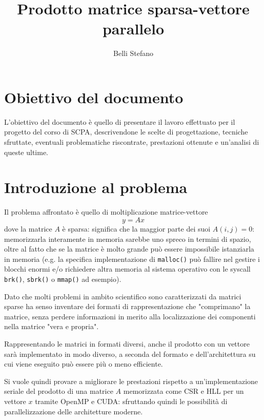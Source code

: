 \documentclass[a4paper,9pt]{extarticle}
\title{Prodotto matrice sparsa-vettore parallelo}
\author{Belli Stefano}
\date{}
\begin{document}
\maketitle
\thispagestyle{empty}
\newpage

\pagestyle{empty}
\tableofcontents
\newpage

\section*{Obiettivo del documento}
L'obiettivo del documento è quello di presentare il lavoro effettuato per il progetto del
corso di SCPA, descrivendone le scelte di progettazione, tecniche sfruttate, 
eventuali problematiche riscontrate, prestazioni ottenute e un'analisi di queste ultime.

\newpage

\pagestyle{plain}

\section{Introduzione al problema}
Il problema affrontato è quello di moltiplicazione matrice-vettore
\begin{equation*}
y = Ax
\end{equation*}
dove la matrice $A$ è sparsa: significa che la maggior parte dei suoi $A(i,j) = 0$: memorizzarla
interamente in memoria sarebbe uno spreco in termini di spazio,
oltre al fatto che se la matrice è molto grande può
essere impossibile istanziarla in memoria (e.g. 
la specifica implementazione di \texttt{malloc()} può fallire nel gestire i blocchi enormi
e/o richiedere altra memoria al sistema operativo con le syscall
\texttt{brk()}, \texttt{sbrk()} o \texttt{mmap()} ad esempio).

Dato che molti problemi in ambito scientifico sono caratterizzati da matrici sparse ha senso inventare
dei formati di rappresentazione che "comprimano" la matrice, senza perdere informazioni in merito alla
localizzazione dei componenti nella matrice "vera e propria".

Rappresentando le matrici in formati diversi, anche il prodotto con un vettore sarà implementato in modo
diverso, a seconda del formato e dell'architettura su cui viene eseguito può essere più o meno efficiente.

Si vuole quindi provare a migliorare le prestazioni rispetto a un'implementazione seriale del prodotto di
una matrice $A$ memorizzata come CSR e HLL per un vettore $x$ tramite OpenMP e CUDA: sfruttando quindi le
possibilità di parallelizzazione delle architetture moderne.
\end{document}

